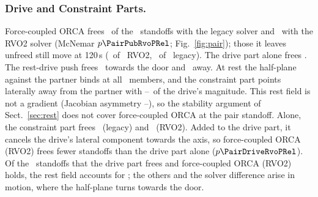 \subsubsection{Drive and Constraint Parts.}
Force-coupled ORCA frees \PairPubFreed\ of the \PairN\ standoffs with the legacy solver and \PairRvoFreed\ with the RVO2 solver (McNemar $p\PairPubRvoPRel$; Fig.~\ref{fig:pair}); those it leaves unfreed still move at 120\,s (\RevAfifteenPairRvoMoving\ of \RevAfifteenPairRvoHeld\ RVO2, \RevAfifteenPairPubMoving\ of \RevAfifteenPairPubHeld\ legacy). The drive part alone frees \PairDriveFreed. The rest-drive push frees \PairFrozenPlusFreed\ towards the door and \PairFrozenMinusFreed\ away. At rest the half-plane against the partner binds at all \RevAelevenPairBinds\ members, and the constraint part points laterally away from the partner with \RevAelevenRatioMin--\RevAelevenRatioMax\ of the drive's magnitude. This rest field is not a gradient (Jacobian asymmetry \PscrJacAsymMin--\RevAelevenJacAsymMax), so the stability argument of Sect.~\ref{sec:rest} does not cover force-coupled ORCA at the pair standoff. Alone, the constraint part frees \PairConsPubFreed\ (legacy) and \PairConsRvoFreed\ (RVO2). Added to the drive part, it cancels the drive's lateral component towards the axis, so force-coupled ORCA (RVO2) frees fewer standoffs than the drive part alone ($p\PairDriveRvoPRel$). Of the \RevAelevenPairDisc\ standoffs that the drive part frees and force-coupled ORCA (RVO2) holds, the rest field accounts for \RevAelevenPairDiscStatic; the others and the solver difference arise in motion, where the half-plane turns towards the door.

